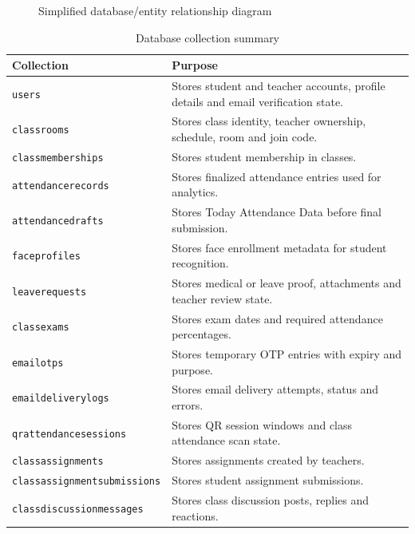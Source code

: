 \begin{figure}[H]
\caption{Simplified database/entity relationship diagram}
\label{fig:er-diagram}
\end{figure}

\begin{table}[H]
\centering
\caption{Database collection summary}
\label{tab:collection-summary}
\begin{tabularx}{\textwidth}{p{3.6cm} X}
\toprule
\textbf{Collection} & \textbf{Purpose}\\
\midrule
\texttt{users} & Stores student and teacher accounts, profile details and email verification state.\\
\texttt{classrooms} & Stores class identity, teacher ownership, schedule, room and join code.\\
\texttt{classmemberships} & Stores student membership in classes.\\
\texttt{attendancerecords} & Stores finalized attendance entries used for analytics.\\
\texttt{attendancedrafts} & Stores Today Attendance Data before final submission.\\
\texttt{faceprofiles} & Stores face enrollment metadata for student recognition.\\
\texttt{leaverequests} & Stores medical or leave proof, attachments and teacher review state.\\
\texttt{classexams} & Stores exam dates and required attendance percentages.\\
\texttt{emailotps} & Stores temporary OTP entries with expiry and purpose.\\
\texttt{emaildeliverylogs} & Stores email delivery attempts, status and errors.\\
\texttt{qrattendancesessions} & Stores QR session windows and class attendance scan state.\\
\texttt{classassignments} & Stores assignments created by teachers.\\
\texttt{classassignmentsubmissions} & Stores student assignment submissions.\\
\texttt{classdiscussionmessages} & Stores class discussion posts, replies and reactions.\\
\bottomrule
\end{tabularx}
\end{table}


